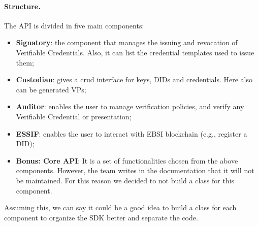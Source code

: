 \paragraph{Structure.}
The API is divided in five main components:
\begin{itemize}
    \item \textbf{Signatory}: the component that manages the issuing and
    revocation of Verifiable Credentials. Also, it can list the credential templates
    used to issue them;
    \item \textbf{Custodian}: gives a \acrshort{crud} interface for keys, DIDs and credentials.
    Here also can be generated VPs;
    \item \textbf{Auditor}: enables the user to manage verification policies,
    and verify any Verifiable Credential or presentation;
    \item \textbf{ESSIF}: enables the user to interact with EBSI blockchain (e.g.,
    register a DID);
    \item \textbf{Bonus: Core API}: It is a set of functionalities chosen from the 
    above components. However, the team writes in the documentation that it will not 
    be maintained. For this reason we decided to not build a class for this component.
\end{itemize}
Assuming this, we can say it could be a good idea to build a class for each component 
to organize the SDK better and separate the code.

